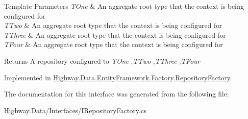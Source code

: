\begin{DoxyTemplParams}{Template Parameters}
{\em T\-One} & An aggregate root type that the context is being configured for\\
\hline
{\em T\-Two} & An aggregate root type that the context is being configured for\\
\hline
{\em T\-Three} & An aggregate root type that the context is being configured for\\
\hline
{\em T\-Four} & An aggregate root type that the context is being configured for\\
\hline
\end{DoxyTemplParams}
\begin{DoxyReturn}{Returns}
A repository configured to {\itshape T\-One} ,{\itshape T\-Two} ,{\itshape T\-Three} ,{\itshape T\-Four}  
\end{DoxyReturn}


Implemented in \hyperlink{class_highway_1_1_data_1_1_entity_framework_1_1_factory_1_1_repository_factory_a7299e0d5fdaf1ceceaf7fbac1d010816}{Highway.\-Data.\-Entity\-Framework.\-Factory.\-Repository\-Factory}.



The documentation for this interface was generated from the following file\-:\begin{DoxyCompactItemize}
\item 
Highway.\-Data/\-Interfaces/I\-Repository\-Factory.\-cs\end{DoxyCompactItemize}
